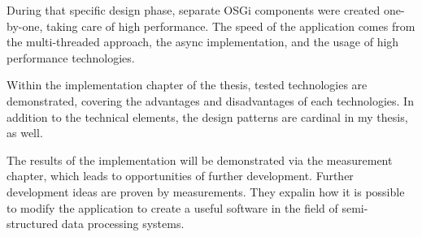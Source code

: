 During that specific design phase, separate OSGi components were created one-by-one, taking care of high performance. The speed of the application comes from the multi-threaded approach, the async implementation, and the usage of high performance technologies.

Within the implementation chapter of the thesis, tested technologies are demonstrated, covering the advantages and disadvantages of each technologies. In addition to the technical elements, the design patterns are cardinal in my thesis, as well.

The results of the implementation will be demonstrated via the measurement chapter, which leads to opportunities of further development. Further development ideas are proven by measurements. They expalin how it is possible to modify the application to create a useful software in the field of semi-structured data processing systems.

\vfill